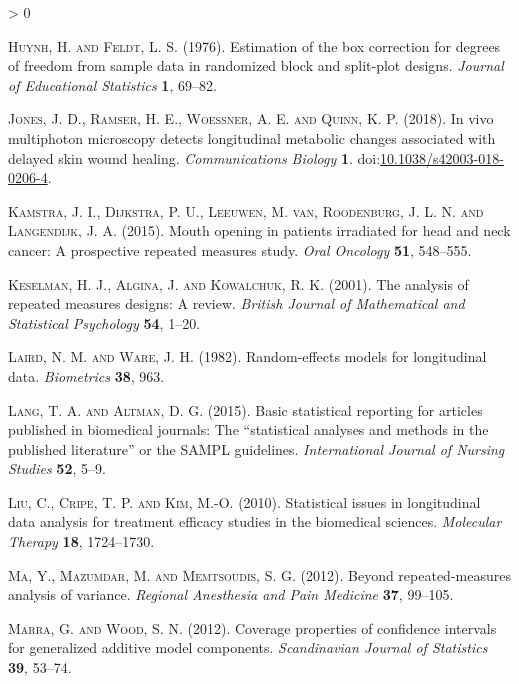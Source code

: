 \documentclass[
]{article}
\newlength{\cslhangindent}
\newenvironment{CSLReferences}[2] %
 {%
  \setlength{\parindent}{0pt}
  \ifodd #1 \everypar{\setlength{\hangindent}{\cslhangindent}}\ignorespaces\fi
  \ifnum #2 > 0
  \setlength{\parskip}{#2\baselineskip}
  \fi
 }%
 {}
\begin{document}
\begin{CSLReferences}{1}{0}
\leavevmode\hypertarget{ref-huynh1976}{}%
\textsc{Huynh, H. and Feldt, L. S.} (1976). Estimation of the box correction for degrees of freedom from sample data in randomized block and split-plot designs. \emph{Journal of Educational Statistics} \textbf{1}, 69--82.

\leavevmode\hypertarget{ref-jones2018}{}%
\textsc{Jones, J. D., Ramser, H. E., Woessner, A. E. and Quinn, K. P.} (2018). In vivo multiphoton microscopy detects longitudinal metabolic changes associated with delayed skin wound healing. \emph{Communications Biology} \textbf{1}. doi:\href{https://doi.org/10.1038/s42003-018-0206-4}{10.1038/s42003-018-0206-4}.

\leavevmode\hypertarget{ref-kamstra2015}{}%
\textsc{Kamstra, J. I., Dijkstra, P. U., Leeuwen, M. van, Roodenburg, J. L. N. and Langendijk, J. A.} (2015). Mouth opening in patients irradiated for head and neck cancer: A prospective repeated measures study. \emph{Oral Oncology} \textbf{51}, 548--555.

\leavevmode\hypertarget{ref-keselman2001}{}%
\textsc{Keselman, H. J., Algina, J. and Kowalchuk, R. K.} (2001). The analysis of repeated measures designs: A review. \emph{British Journal of Mathematical and Statistical Psychology} \textbf{54}, 1--20.

\leavevmode\hypertarget{ref-laird1982}{}%
\textsc{Laird, N. M. and Ware, J. H.} (1982). Random-effects models for longitudinal data. \emph{Biometrics} \textbf{38}, 963.

\leavevmode\hypertarget{ref-lang2015}{}%
\textsc{Lang, T. A. and Altman, D. G.} (2015). Basic statistical reporting for articles published in biomedical journals: The {``}statistical analyses and methods in the published literature{''} or the {SAMPL} guidelines. \emph{International Journal of Nursing Studies} \textbf{52}, 5--9.

\leavevmode\hypertarget{ref-liu2010}{}%
\textsc{Liu, C., Cripe, T. P. and Kim, M.-O.} (2010). Statistical issues in longitudinal data analysis for treatment efficacy studies in the biomedical sciences. \emph{Molecular Therapy} \textbf{18}, 1724--1730.

\leavevmode\hypertarget{ref-ma2012}{}%
\textsc{Ma, Y., Mazumdar, M. and Memtsoudis, S. G.} (2012). Beyond repeated-measures analysis of variance. \emph{Regional Anesthesia and Pain Medicine} \textbf{37}, 99--105.

\leavevmode\hypertarget{ref-marra2012}{}%
\textsc{Marra, G. and Wood, S. N.} (2012). Coverage properties of confidence intervals for generalized additive model components. \emph{Scandinavian Journal of Statistics} \textbf{39}, 53--74.


\end{CSLReferences}
\end{document}
